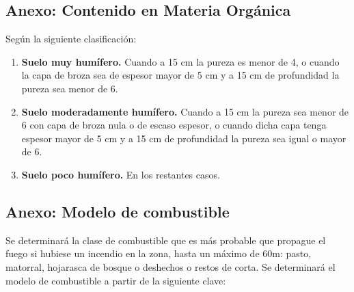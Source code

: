 \subsection{Anexo: Contenido en Materia Orgánica}\label{sec:MatOrg}


Según la siguiente clasificación:

\begin{enumerate}
    \item \textbf{Suelo muy humífero.} Cuando a 15 cm la pureza es menor de 4, o cuando la capa de broza sea de espesor mayor de 5 cm y a 15 cm de profundidad la pureza sea menor de 6.
    \item \textbf{Suelo moderadamente humífero.} Cuando a 15 cm la pureza sea menor de 6 con capa de broza nula o de escaso espesor, o cuando dicha capa tenga espesor mayor de 5 cm y a 15 cm de profundidad la pureza sea igual o mayor de 6.
    \item \textbf{Suelo poco humífero.} En los restantes casos.
\end{enumerate}




\subsection{Anexo: Modelo de combustible}\label{sec:modComb}
Se determinará la clase de combustible que es más probable que propague el fuego si hubiese un incendio en la zona, hasta un máximo de 60m: pasto, matorral, hojarasca de bosque o deshechos o restos de corta. Se determinará el modelo de combustible a partir de la siguiente clave:

